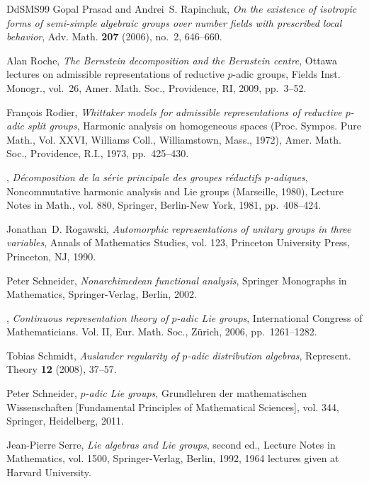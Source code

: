 \documentclass[a4paper]{amsart}
\numberwithin{equation}{section}
\theoremstyle{remark}
\theoremstyle{definition}
\begin{document}
\begin{thebibliography}{DdSMS99}
Gopal Prasad and Andrei~S. Rapinchuk, \emph{On the existence of isotropic forms
  of semi-simple algebraic groups over number fields with prescribed local
  behavior}, Adv. Math. \textbf{207} (2006), no.~2, 646--660. 

Alan Roche, \emph{The {B}ernstein decomposition and the {B}ernstein centre},
  Ottawa lectures on admissible representations of reductive {$p$}-adic groups,
  Fields Inst. Monogr., vol.~26, Amer. Math. Soc., Providence, RI, 2009,
  pp.~3--52. 

Fran\c{c}ois Rodier, \emph{Whittaker models for admissible representations of
  reductive {$p$}-adic split groups}, Harmonic analysis on homogeneous spaces
  ({P}roc. {S}ympos. {P}ure {M}ath., {V}ol. {XXVI}, {W}illiams {C}oll.,
  {W}illiamstown, {M}ass., 1972), Amer. Math. Soc., Providence, R.I., 1973,
  pp.~425--430. 

\bysame, \emph{D\'{e}composition de la s\'{e}rie principale des groupes
  r\'{e}ductifs {$p$}-adiques}, Noncommutative harmonic analysis and {L}ie
  groups ({M}arseille, 1980), Lecture Notes in Math., vol. 880, Springer,
  Berlin-New York, 1981, pp.~408--424. 

Jonathan~D. Rogawski, \emph{Automorphic representations of unitary groups in
  three variables}, Annals of Mathematics Studies, vol. 123, Princeton
  University Press, Princeton, NJ, 1990. 

Peter Schneider, \emph{Nonarchimedean functional analysis}, Springer Monographs
  in Mathematics, Springer-Verlag, Berlin, 2002. 

\bysame, \emph{Continuous representation theory of {$p$}-adic {L}ie groups},
  International {C}ongress of {M}athematicians. {V}ol. {II}, Eur. Math. Soc.,
  Z\"{u}rich, 2006, pp.~1261--1282. 

Tobias Schmidt, \emph{Auslander regularity of {$p$}-adic distribution
  algebras}, Represent. Theory \textbf{12} (2008), 37--57. 

Peter Schneider, \emph{{$p$}-adic {L}ie groups}, Grundlehren der mathematischen
  Wissenschaften [Fundamental Principles of Mathematical Sciences], vol. 344,
  Springer, Heidelberg, 2011. 

Jean-Pierre Serre, \emph{Lie algebras and {L}ie groups}, second ed., Lecture
  Notes in Mathematics, vol. 1500, Springer-Verlag, Berlin, 1992, 1964 lectures
  given at Harvard University. 


\end{thebibliography}
\end{document}
